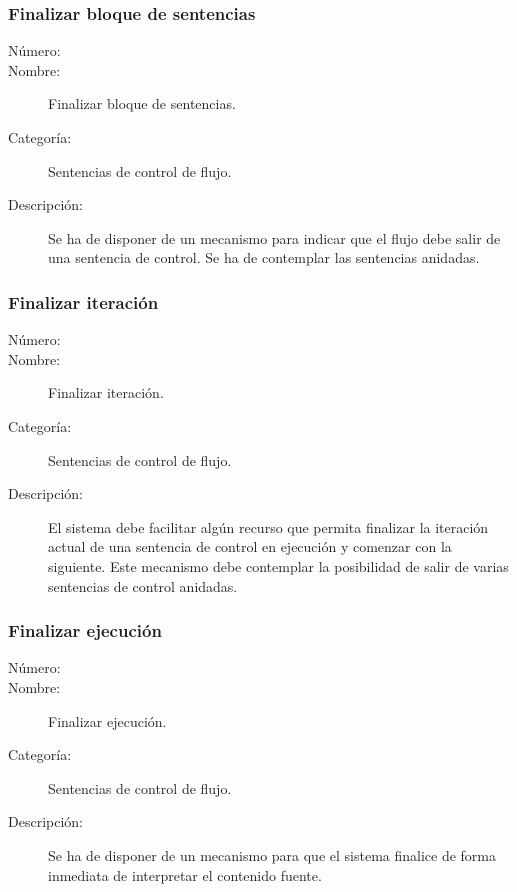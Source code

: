 \subsubsection{Finalizar bloque de sentencias}
\begin{framed}
	\begin{description}
		\item [Número:] \cn
		\item [Nombre:] Finalizar bloque de sentencias.
		\item [Categoría:] Sentencias de control de flujo.
		\item [Descripción:] Se ha de disponer de un mecanismo para indicar que el flujo debe salir de una sentencia de control. Se ha de contemplar
		las sentencias anidadas.
	\end {description}
\end{framed}



\subsubsection{Finalizar iteración}
\begin{framed}
	\begin{description}
		\item [Número:] \cn
		\item [Nombre:] Finalizar iteración.
		\item [Categoría:] Sentencias de control de flujo.
		\item [Descripción:] El sistema debe facilitar algún recurso que permita finalizar la iteración actual
		de una sentencia de control en ejecución y comenzar con la siguiente. Este
		mecanismo debe contemplar la posibilidad de salir de varias sentencias de control anidadas.
	\end {description}
\end{framed}

\subsubsection{Finalizar ejecución}
\begin{framed}
	\begin{description}
		\item [Número:] \cn
		\item [Nombre:] Finalizar ejecución.
		\item [Categoría:] Sentencias de control de flujo.
		\item [Descripción:] Se ha de disponer de un mecanismo para que el sistema finalice de forma inmediata de
		interpretar el contenido fuente.
	\end {description}
\end{framed}

